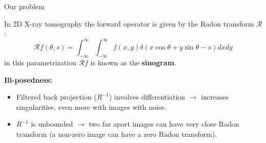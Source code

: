 \begin{frame}{Our problem}

In 2D X-ray tomography the forward operator is given by the Radon transform $\mathcal{R}$:
$$
\mathcal{R}f(\theta,s)= \int_{-\infty}^{\infty}\int_{-\infty}^{\infty}f(x,y)\delta(x\cos\theta+y\sin\theta-s)dxdy
$$
in this parametrization $\mathcal{R}f$ is known as the \textbf{sinogram}.

\pause
\bigskip

\textbf{Ill-posedness:}    
\begin{itemize}
\item Filtered back projection ($R^{-1}$) involves differentiation $\longrightarrow$ increases singularities, even more with images with noise. 
\item $R^{-1}$ is unbounded $\longrightarrow$ two far apart images can have very close Radon transform (a non-zero image can have a zero Radon transform).
\end{itemize}
\end{frame}


